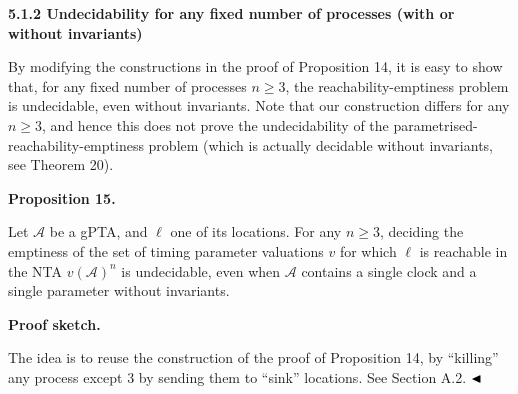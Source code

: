  
 
 
\par\medskip\noindent\textbf{5.1.2 Undecidability for any fixed number of processes (with or without invariants)}\par
 
 
By modifying the constructions in the proof of Proposition 14, it is easy to show that, for any fixed number of processes $n\geq 3$, the reachability-emptiness problem is undecidable, even without invariants. Note that our construction differs for any $n\geq 3$, and hence this does not prove the undecidability of the parametrised-reachability-emptiness problem (which is actually decidable without invariants, see Theorem 20).\par
 
 
 
\par\medskip\noindent\textbf{Proposition 15.}\par
 
 
Let $\mathcal{A}$ be a gPTA, and $\mathrm{\ell}$ one of its locations. For any $n\geq 3$, deciding the emptiness of the set of timing parameter valuations $v$ for which $\mathrm{\ell}$ is reachable in the NTA ${v(\mathcal{A})}^{n}$ is undecidable, even when $\mathcal{A}$ contains a single clock and a single parameter without invariants.\par
 
 
 
 
\par\medskip\noindent\textbf{Proof sketch.}\par
 
 
The idea is to reuse the construction of the proof of Proposition 14, by “killing” any process except 3 by sending them to “sink” locations. See Section A.2. $\hfill\blacktriangleleft$\par
 
 
 
